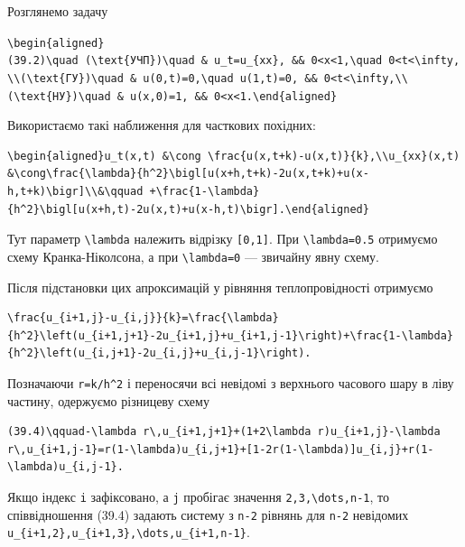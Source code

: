 \documentclass[
  ukrainian,
]{article}
\begin{document}
Розглянемо задачу

\texttt{\textbackslash{}begin\{aligned\}(39.2)\textbackslash{}quad\ (\textbackslash{}text\{УЧП\})\textbackslash{}quad\ \&\ u\_t=u\_\{xx\},\ \&\&\ 0\textless{}x\textless{}1,\textbackslash{}quad\ 0\textless{}t\textless{}\textbackslash{}infty,\textbackslash{}\textbackslash{}(\textbackslash{}text\{ГУ\})\textbackslash{}quad\ \&\ u(0,t)=0,\textbackslash{}quad\ u(1,t)=0,\ \&\&\ 0\textless{}t\textless{}\textbackslash{}infty,\textbackslash{}\textbackslash{}(\textbackslash{}text\{НУ\})\textbackslash{}quad\ \&\ u(x,0)=1,\ \&\&\ 0\textless{}x\textless{}1.\textbackslash{}end\{aligned\}}

Використаємо такі наближення для часткових похідних:

\begin{verbatim}
\begin{aligned}u_t(x,t) &\cong \frac{u(x,t+k)-u(x,t)}{k},\\u_{xx}(x,t) &\cong\frac{\lambda}{h^2}\bigl[u(x+h,t+k)-2u(x,t+k)+u(x-h,t+k)\bigr]\\&\qquad +\frac{1-\lambda}{h^2}\bigl[u(x+h,t)-2u(x,t)+u(x-h,t)\bigr].\end{aligned}
\end{verbatim}

Тут параметр \texttt{\textbackslash{}lambda} належить відрізку
\texttt{{[}0,1{]}}. При \texttt{\textbackslash{}lambda=0.5} отримуємо
схему Кранка-Ніколсона, а при \texttt{\textbackslash{}lambda=0} ---
звичайну явну схему.

Після підстановки цих апроксимацій у рівняння теплопровідності отримуємо

\begin{verbatim}
\frac{u_{i+1,j}-u_{i,j}}{k}=\frac{\lambda}{h^2}\left(u_{i+1,j+1}-2u_{i+1,j}+u_{i+1,j-1}\right)+\frac{1-\lambda}{h^2}\left(u_{i,j+1}-2u_{i,j}+u_{i,j-1}\right).
\end{verbatim}

Позначаючи \texttt{r=k/h\^{}2} і переносячи всі невідомі з верхнього
часового шару в ліву частину, одержуємо різницеву схему

\begin{verbatim}
(39.4)\qquad-\lambda r\,u_{i+1,j+1}+(1+2\lambda r)u_{i+1,j}-\lambda r\,u_{i+1,j-1}=r(1-\lambda)u_{i,j+1}+[1-2r(1-\lambda)]u_{i,j}+r(1-\lambda)u_{i,j-1}.
\end{verbatim}

Якщо індекс \texttt{i} зафіксовано, а \texttt{j} пробігає значення
\texttt{2,3,\textbackslash{}dots,n-1}, то співвідношення (39.4) задають
систему з \texttt{n-2} рівнянь для \texttt{n-2} невідомих
\texttt{u\_\{i+1,2\},u\_\{i+1,3\},\textbackslash{}dots,u\_\{i+1,n-1\}}.
\end{document}
